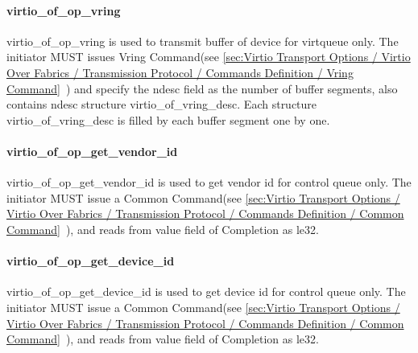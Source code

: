 \paragraph{virtio_of_op_vring}\label{sec:Virtio Transport Options / Virtio Over Fabrics / Transmission Protocol / Opcodes Definition / virtio_of_op_vring}

virtio_of_op_vring is used to transmit buffer of device for virtqueue only. The initiator MUST issues Vring Command(see \ref{sec:Virtio Transport Options / Virtio Over Fabrics / Transmission Protocol / Commands Definition / Vring Command}~) and specify the ndesc field as the number of buffer segments, also contains ndesc structure virtio_of_vring_desc. Each structure virtio_of_vring_desc is filled by each buffer segment one by one.

\paragraph{virtio_of_op_get_vendor_id}\label{sec:Virtio Transport Options / Virtio Over Fabrics / Transmission Protocol / Opcodes Definition / virtio_of_op_get_vendor_id}

virtio_of_op_get_vendor_id is used to get vendor id for control queue only. The initiator MUST issue a Common Command(see \ref{sec:Virtio Transport Options / Virtio Over Fabrics / Transmission Protocol / Commands Definition / Common Command}~), and reads from value field of Completion as le32.

\paragraph{virtio_of_op_get_device_id}\label{sec:Virtio Transport Options / Virtio Over Fabrics / Transmission Protocol / Opcodes Definition / virtio_of_op_get_device_id}

virtio_of_op_get_device_id is used to get device id for control queue only. The initiator MUST issue a Common Command(see \ref{sec:Virtio Transport Options / Virtio Over Fabrics / Transmission Protocol / Commands Definition / Common Command}~), and reads from value field of Completion as le32.

